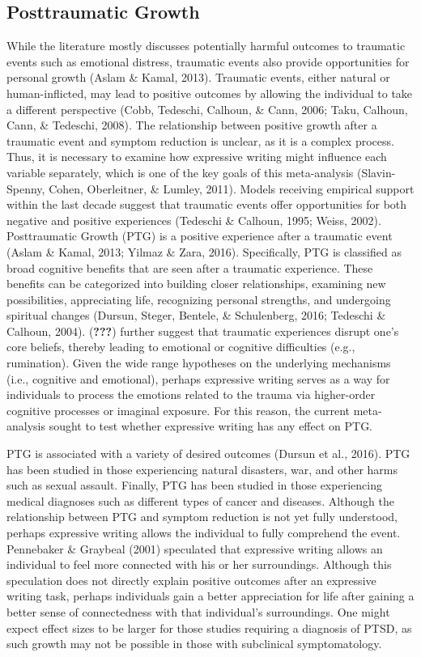 \documentclass[man]{apa6}
\theoremstyle{definition}
\theoremstyle{definition}
\theoremstyle{definition}
\theoremstyle{remark}
\begin{document}
\subsection{Posttraumatic Growth}\label{posttraumatic-growth}

While the literature mostly discusses potentially harmful outcomes to
traumatic events such as emotional distress, traumatic events also
provide opportunities for personal growth (Aslam \& Kamal, 2013).
Traumatic events, either natural or human-inflicted, may lead to
positive outcomes by allowing the individual to take a different
perspective (Cobb, Tedeschi, Calhoun, \& Cann, 2006; Taku, Calhoun,
Cann, \& Tedeschi, 2008). The relationship between positive growth after
a traumatic event and symptom reduction is unclear, as it is a complex
process. Thus, it is necessary to examine how expressive writing might
influence each variable separately, which is one of the key goals of
this meta-analysis (Slavin-Spenny, Cohen, Oberleitner, \& Lumley, 2011).
Models receiving empirical support within the last decade suggest that
traumatic events offer opportunities for both negative and positive
experiences (Tedeschi \& Calhoun, 1995; Weiss, 2002). Posttraumatic
Growth (PTG) is a positive experience after a traumatic event (Aslam \&
Kamal, 2013; Yilmaz \& Zara, 2016). Specifically, PTG is classified as
broad cognitive benefits that are seen after a traumatic experience.
These benefits can be categorized into building closer relationships,
examining new possibilities, appreciating life, recognizing personal
strengths, and undergoing spiritual changes (Dursun, Steger, Bentele, \&
Schulenberg, 2016; Tedeschi \& Calhoun, 2004). ({\textbf{???}}) further
suggest that traumatic experiences disrupt one's core beliefs, thereby
leading to emotional or cognitive difficulties (e.g., rumination). Given
the wide range hypotheses on the underlying mechanisms (i.e., cognitive
and emotional), perhaps expressive writing serves as a way for
individuals to process the emotions related to the trauma via
higher-order cognitive processes or imaginal exposure. For this reason,
the current meta-analysis sought to test whether expressive writing has
any effect on PTG.

PTG is associated with a variety of desired outcomes (Dursun et al.,
2016). PTG has been studied in those experiencing natural disasters,
war, and other harms such as sexual assault. Finally, PTG has been
studied in those experiencing medical diagnoses such as different types
of cancer and diseases. Although the relationship between PTG and
symptom reduction is not yet fully understood, perhaps expressive
writing allows the individual to fully comprehend the event. Pennebaker
\& Graybeal (2001) speculated that expressive writing allows an
individual to feel more connected with his or her surroundings. Although
this speculation does not directly explain positive outcomes after an
expressive writing task, perhaps individuals gain a better appreciation
for life after gaining a better sense of connectedness with that
individual's surroundings. One might expect effect sizes to be larger
for those studies requiring a diagnosis of PTSD, as such growth may not
be possible in those with subclinical symptomatology.
\end{document}
